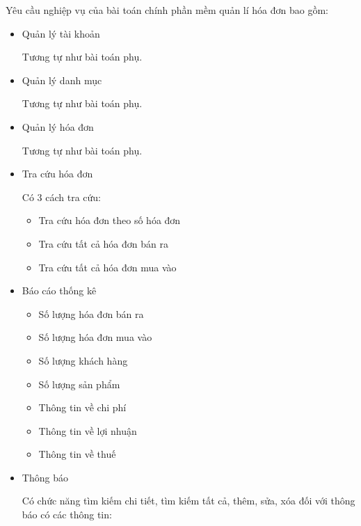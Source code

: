 Yêu cầu nghiệp vụ của bài toán chính phần mềm quản lí hóa đơn bao gồm:

\begin{itemize}

\item Quản lý tài khoản

Tương tự như bài toán phụ.

\item Quản lý danh mục

Tương tự như bài toán phụ.

\item Quản lý hóa đơn

Tương tự như bài toán phụ.

\item Tra cứu hóa đơn

Có 3 cách tra cứu:

\begin{itemize}

\item Tra cứu hóa đơn theo số hóa đơn

\item Tra cứu tất cả hóa đơn bán ra

\item Tra cứu tất cả hóa đơn mua vào

\end{itemize}

\item Báo cáo thống kê

\begin{itemize}

\item Số lượng hóa đơn bán ra

\item Số lượng hóa đơn mua vào

\item Số lượng khách hàng

\item Số lượng sản phẩm
\item Thông tin về chi phí
\item Thông tin về lợi nhuận
\item Thông tin về thuế
\end{itemize}

\item Thông báo

Có chức năng tìm kiếm chi tiết, tìm kiếm tất cả, thêm, sửa, xóa đối với thông báo có các thông tin:

\begin{itemize}


\end{itemize}
\end{itemize}
